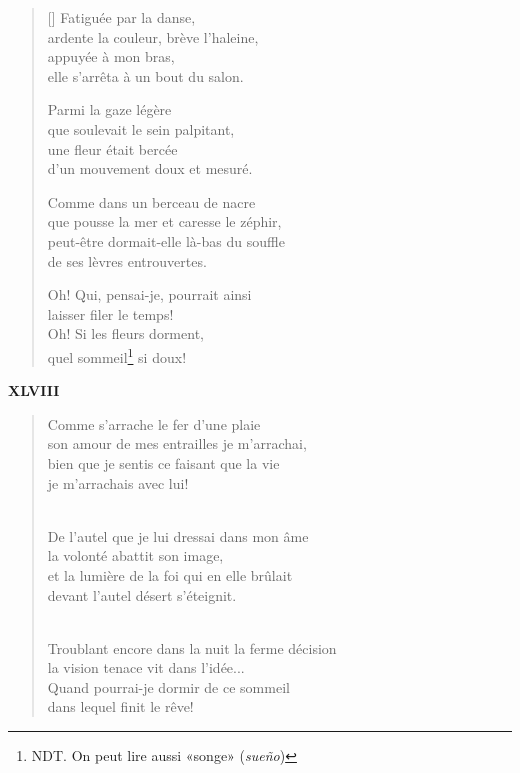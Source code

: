 \documentclass[a4paper,12pt]{book}
\begin{document}
\settowidth{\versewidth}{que pousse la mer et caresse le zéphir,}

\begin{verse}[\versewidth]
  Fatiguée par la danse, \\
  ardente la couleur, brève l'haleine, \\
  appuyée à mon bras, \\
  elle s'arrêta à un bout du salon.

  Parmi la gaze légère \\
  que soulevait le sein palpitant, \\
  une fleur était bercée \\
  d'un mouvement doux et mesuré.

  Comme dans un berceau de nacre \\
  que pousse la mer et caresse le zéphir, \\
  peut-être dormait-elle là-bas du souffle \\
  de ses lèvres entrouvertes.

  Oh! Qui, pensai-je, pourrait ainsi \\
  laisser filer le temps! \\
  Oh! Si les fleurs dorment, \\
  quel sommeil\footnote{NDT. On peut lire aussi «songe» (\emph{sueño})} si doux!
\end{verse}



\bigskip

\begin{center}
  \textbf{XLVIII}
\end{center}


\begin{verse}
Comme s'arrache le fer d'une plaie \\
son amour de mes entrailles je m'arrachai, \\
bien que je sentis ce faisant que la vie \\
je m'arrachais avec lui! \\ \

De l'autel que je lui dressai dans mon âme \\
la volonté abattit son image, \\
et la lumière de la foi qui en elle brûlait \\
devant l'autel désert s'éteignit. \\ \

Troublant encore dans la nuit la ferme décision \\
la vision tenace vit dans l'idée... \\
Quand pourrai-je dormir de ce sommeil \\
dans lequel finit le rêve! \\
\end{verse}
\end{document}
